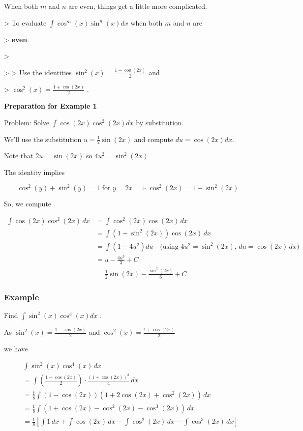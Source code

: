 When both $m$ and $n$ are even, things get a little more complicated.


> To evaluate $\int\cos^m(x)\sin^n(x)dx$ when both $m$ and $n$ are

> \textbf{even}.

>

> > Use the identities $\sin^2(x)=\frac{1-\cos(2x)}{2}$ and

> $\cos^2(x)=\frac{1+\cos(2x)}{2}$ .


\textbf{Preparation for Example 1}


Problem: Solve $\int \cos(2x) \cos^2(2x)dx$ by substitution.


We'll use the substitution $u = \frac{1}{2} \sin(2x)$ and compute $du=\cos(2x)dx$.


Note that $2u = \sin(2x)$ so $4u^2 = \sin^2(2x)$


The identity implies

\[
\cos^2(y) + \sin^2(y) = 1 \text{ for } y = 2x \text{ } \Rightarrow \cos^2(2x) = 1 - \sin^2(2x)
\]

So, we compute


\begin{align}
\int \cos(2x) \cos^2(2x)\,dx &= \int \cos^2(2x) \cos(2x)\,dx \\&= \int \left( 1 - \sin^2(2x) \right) \cos(2x)\,dx \\&= \int \left( 1 - 4u^2 \right) du \quad \text{(using } 4u^2 = \sin^2(2x),\, du = \cos(2x)\,dx\text{)} \\&= u - \frac{4u^3}{3} + C \\&= \frac{1}{2} \sin(2x) - \frac{\sin^3(2x)}{6} + C
\end{align}


\subsubsection{Example}
\label{sss:exam-1a79}


Find $\int\sin^2(x)\cos^4(x)dx$ .


As $\sin^2(x)=\frac{1-\cos(2x)}{2}$ and $\cos^2(x)=\frac{1+\cos(2x)}{2}$

we have


\begin{align}
& \int \sin^2(x) \cos^4(x) \, dx \\& = \int \left(\frac{1 - \cos(2x)}{2}\right) \cdot \frac{(1 + \cos(2x))^2}{4} \, dx \\& = \frac{1}{8} \int (1 - \cos(2x))(1 + 2\cos(2x) + \cos^2(2x)) \, dx \\& = \frac{1}{8} \int \left(1 + \cos(2x) - \cos^2(2x) - \cos^3(2x)\right) \, dx \\& = \frac{1}{8} \left[\int 1 \, dx + \int \cos(2x) \, dx - \int \cos^2(2x) \, dx - \int \cos^3(2x) \, dx\right]
\end{align}


